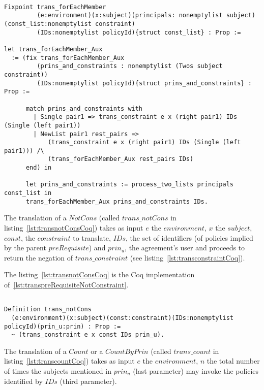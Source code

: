 \begin{minipage}[c]{0.95\textwidth}
\begin{lstlisting}

Fixpoint trans_forEachMember
         (e:environment)(x:subject)(principals: nonemptylist subject)(const_list:nonemptylist constraint)
         (IDs:nonemptylist policyId){struct const_list} : Prop := 

let trans_forEachMember_Aux   
  := (fix trans_forEachMember_Aux
         (prins_and_constraints : nonemptylist (Twos subject constraint))
         (IDs:nonemptylist policyId){struct prins_and_constraints} : Prop :=

      match prins_and_constraints with
        | Single pair1 => trans_constraint e x (right pair1) IDs (Single (left pair1)) 
        | NewList pair1 rest_pairs =>
            (trans_constraint e x (right pair1) IDs (Single (left pair1))) /\
            (trans_forEachMember_Aux rest_pairs IDs)
      end) in

      let prins_and_constraints := process_two_lists principals const_list in
      trans_forEachMember_Aux prins_and_constraints IDs.

\end{lstlisting}
\end{minipage}

The translation of a $NotCons$ (called $trans\_notCons$ in listing~\ref{lst:transnotConsCoq}) takes as input $e$ the $environment$, $x$ the $subject$, $const$, the $constraint$ to translate, $IDs$, the set of identifiers (of policies implied by the parent $preRequisite$) and $prin_{u}$, the agreement's user and proceeds to return the negation of $trans\_constraint$ (see listing~\ref{lst:transconstraintCoq}).

The listing~\ref{lst:transnotConsCoq} is the Coq implementation of~\ref{lst:transpreRequisiteNotConstraint}.

\begin{lstlisting}

Definition trans_notCons
  (e:environment)(x:subject)(const:constraint)(IDs:nonemptylist policyId)(prin_u:prin) : Prop :=
  ~ (trans_constraint e x const IDs prin_u).
\end{lstlisting}




The translation of a $Count$ or a $CountByPrin$ (called $trans\_count$ in listing~\ref{lst:transcountCoq}) takes as input $e$ the $environment$, $n$ the total number of times the subjects mentioned in $prin_{u}$ (last parameter) may invoke the policies identified by $IDs$ (third parameter).

